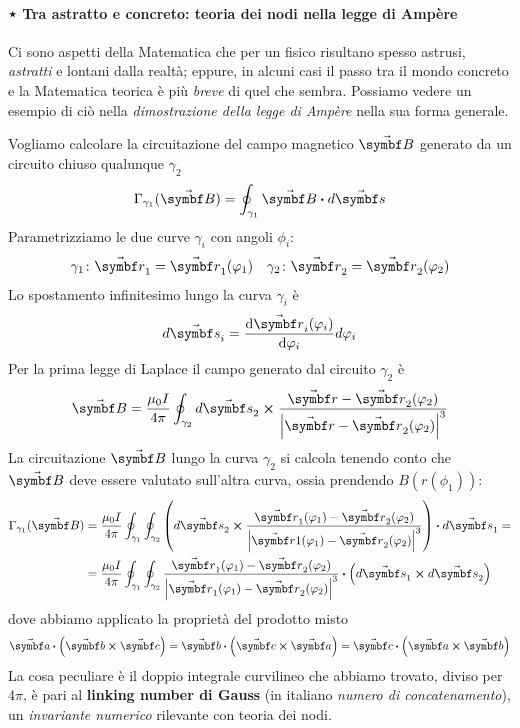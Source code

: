 \paragraph{⋆ Tra astratto e concreto: teoria dei nodi nella legge di Ampère}
Ci sono aspetti della Matematica che per un fisico risultano spesso astrusi, \textit{astratti} e lontani dalla realtà; eppure, in alcuni casi il passo tra il mondo concreto e la Matematica teorica è più \textit{breve} di quel che sembra. Possiamo vedere un esempio di ciò nella \textit{dimostrazione della legge di Ampère} nella sua forma generale.
\begin{demonstrationwtnoqed}
Vogliamo calcolare la circuitazione del campo magnetico $\vba{B}$ generato da un circuito chiuso qualunque $\gamma_2$ 
\begin{equation*}
	\Gamma_{\gamma_1}(\vba{B})=\oint_{\gamma_1}\vba{B}\vdot d\vba{s}
\end{equation*}
Parametrizziamo le due curve $\gamma_i$ con angoli $\phi_i$:
\begin{align*}
	\gamma_1\colon \vba{r}_1=\vba{r}_1(\phi_1) && 
	\gamma_2\colon \vba{r}_2=\vba{r}_2(\phi_2)
\end{align*}
Lo spostamento infinitesimo lungo la curva $\gamma_i$ è
\begin{equation*}
	d\vba{s}_i=\dv{\vba{r}_i(\phi_i)}{\phi_i}d\phi_i
\end{equation*}
Per la prima legge di Laplace il campo generato dal circuito $\gamma_2$ è
\begin{equation*}
	\vba{B}=\frac{\mu_0 I}{4\pi}\oint_{\gamma_2}d\vba{s}_2\cross\frac{\vba{r}-\vba{r}_2(\phi_2)}{\abs{\vba{r}-\vba{r}_2(\phi_2)}^3}
\end{equation*}
La circuitazione $\vba{B}$ lungo la curva $\gamma_2$ si calcola tenendo conto che $\vba{B}$ deve essere valutato sull'altra curva, ossia prendendo $B(r(\phi_1))$: 
\begin{align*}
	\Gamma_{\gamma_1}(\vba{B})&=\frac{\mu_0 I}{4\pi}\oint_{\gamma_1} \oint_{\gamma_2} \left(d\vba{s}_2 \cross \frac{\vba{r}_1(\phi_1) - \vba{r}_2(\phi_2)}{\abs{\vba{r}1(\phi_1) - \vba{r}_2(\phi_2)}^3}\right) \vdot d\vba{s}_1=\\
	&=\frac{\mu_0 I}{4\pi}\oint_{\gamma_1} \oint_{\gamma_2} \frac{\vba{r}_1(\phi_1) - \vba{r}_2 (\phi_2)}{\abs{\vba{r}_1(\phi_1) - \vba{r}_2(\phi_2)}^3} \vdot \left(d\vba{s}_1\cross d\vba{s}_2\right)
\end{align*}
dove abbiamo applicato la proprietà del prodotto misto
\begin{equation*}
	\vba{a}\vdot\left(\vba{b}\cross\vba{c}\right)=
	\vba{b}\vdot\left(\vba{c}\cross\vba{a}\right)=
	\vba{c}\vdot\left(\vba{a}\cross\vba{b}\right)
\end{equation*}
La cosa peculiare è il doppio integrale curvilineo che abbiamo trovato, diviso per $4\pi$, è pari al \textbf{linking number di Gauss} (in italiano \textit{numero di concatenamento}), un \textit{invariante numerico} rilevante con teoria dei nodi.
\end{demonstrationwtnoqed}
